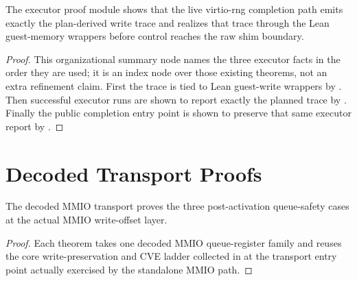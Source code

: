 \begin{theorem}
\label{thm:executor-kernel}
\leanok
The executor proof module shows that the live virtio-rng completion path emits exactly the plan-derived write trace and realizes that trace through the Lean guest-memory wrappers before control reaches the raw shim boundary.
\end{theorem}

\begin{proof}
\leanok
{}
This organizational summary node names the three executor facts in the order they are used; it is an index node over those existing theorems, not an extra refinement claim.
First the trace is tied to Lean guest-write wrappers by .
Then successful executor runs are shown to report exactly the planned trace by .
Finally the public completion entry point is shown to preserve that same executor report by .
\end{proof}

\section{Decoded Transport Proofs}

\begin{theorem}
\label{thm:mmio-queue-safety}
\leanok
The decoded MMIO transport proves the three post-activation queue-safety cases at the actual MMIO write-offset layer.
\end{theorem}

\begin{proof}
\leanok
{}
Each theorem takes one decoded MMIO queue-register family and reuses the core write-preservation and CVE ladder collected in  at the transport entry point actually exercised by the standalone MMIO path.
\end{proof}

